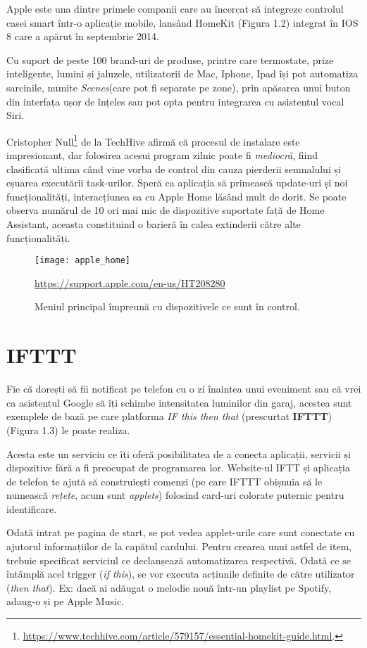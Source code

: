 Apple este una dintre primele companii care au încercat să integreze controlul casei smart într-o aplicație mobile, lansând HomeKit (Figura 1.2) integrat în IOS 8 care a apărut în septembrie 2014.

Cu suport de peste 100 brand-uri de produse, printre care termostate, prize inteligente, lumini și jaluzele, utilizatorii de Mac, Iphone, Ipad își pot automatiza sarcinile, numite \emph{Scenes}(care pot fi separate pe zone), prin apăsarea unui buton din interfața ușor de înțeles sau pot opta pentru integrarea cu asistentul vocal Siri.

Cristopher Null\footnote{\url{https://www.techhive.com/article/579157/essential-homekit-guide.html}.} de la TechHive afirmă că procesul de instalare este impresionant, dar folosirea acesui program zilnic poate fi \emph{mediocră}, fiind clasificată ultima când vine vorba de control din cauza pierderii semnalului și eșuarea executării task-urilor. Speră ca aplicația să primească update-uri și noi funcționalități, interacțiunea sa cu Apple Home lăsând mult de dorit. Se poate observa numărul de 10 ori mai mic de dispozitive suportate față de Home Assistant, aceasta constituind o barieră în calea extinderii către alte funcționalități.

\begin{figure}[h]
	\centering
	\texttt{[image: apple\_home]}
	\caption{Meniul principal împreună cu dispozitivele ce sunt în control.}\url{https://support.apple.com/en-us/HT208280}
	\label{fig:apple_home}
\end{figure} 


\section{IFTTT}

Fie că dorești să fii notificat pe telefon cu o zi înaintea unui eveniment sau că vrei ca asistentul Google să îți schimbe intensitatea luminilor din garaj, acestea sunt exemplele de bază pe care platforma \emph{IF this then that} (prescurtat \textbf{IFTTT}) (Figura 1.3) le poate realiza.

Acesta este un serviciu ce îți oferă posibilitatea de a conecta aplicații, servicii și dispozitive fără a fi preocupat de programarea lor. Website-ul IFTT și aplicația de telefon te ajută să construiești comenzi (pe care IFTTT obișnuia să le numească \emph{rețete}, acum sunt \emph{applets}) folosind card-uri colorate puternic pentru identificare.

Odată intrat pe pagina de start, se pot vedea applet-urile care sunt conectate cu ajutorul informațiilor de la capătul cardului. Pentru crearea unui astfel de item, trebuie specificat serviciul ce declanșează automatizarea respectivă. Odată ce se întâmplă acel trigger (\emph{if this}), se vor executa acțiunile definite de către utilizator (\emph{then that}). Ex: dacă ai adăugat o melodie nouă într-un playlist pe Spotify, adaug-o și pe Apple Music.


